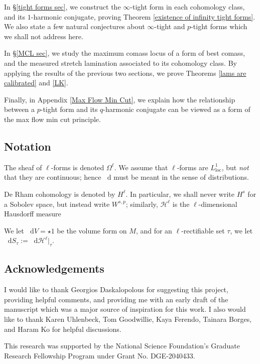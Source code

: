 \documentclass[reqno,11pt]{amsart}
\newcommand*\dif{\mathop{}\!\mathrm{d}}
\newcommand{\loc}{\mathrm{loc}}
\theoremstyle{definition}
\numberwithin{equation}{section}
\begin{document}
In \S\ref{tight forms sec}, we construct the $\infty$-tight form in each cohomology class, and its $1$-harmonic conjugate, proving Theorem \ref{existence of infinity tight forms}.
We also state a few natural conjectures about $\infty$-tight and $p$-tight forms which we shall not address here.

In \S\ref{MCL sec}, we study the maximum comass locus of a form of best comass, and the measured stretch lamination associated to its cohomology class.
By applying the results of the previous two sections, we prove Theorems \ref{lams are calibrated} and \ref{LK}.

Finally, in Appendix \ref{Max Flow Min Cut}, we explain how the relationship between a $p$-tight form and its $q$-harmonic conjugate can be viewed as a form of the max flow min cut principle.

\subsection{Notation}
The sheaf of $\ell$-forms is denoted $\Omega^\ell$.
We assume that $\ell$-forms are $L^1_\loc$, but \emph{not} that they are continuous; hence $\dif$ must be meant in the sense of distributions.

De Rham cohomology is denoted by $H^\ell$.
In particular, we shall never write $H^s$ for a Sobolev space, but instead write $W^{s, p}$; similarly, $\mathcal H^\ell$ is the $\ell$-dimensional Hausdorff measure

We let $\dif V = \star 1$ be the volume form on $M$, and for an $\ell$-rectifiable set $\tau$, we let $\dif S_\tau := \dif \mathcal H^\ell|_\tau$.

\subsection{Acknowledgements}
I would like to thank Georgios Daskalopolous for suggesting this project, providing helpful comments, and providing me with an early draft of the manuscript \cite{daskalopoulos2023} which was a major source of inspiration for this work.
I also would like to thank Karen Uhlenbeck, Tom Goodwillie, Kaya Ferendo, Tainara Borges, and Haram Ko for helpful discussions.

This research was supported by the National Science Foundation's Graduate Research Fellowship Program under Grant No. DGE-2040433.


\end{document}
